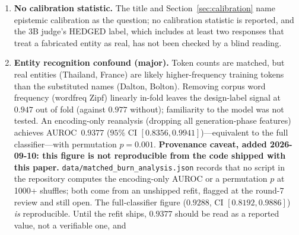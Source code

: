 \documentclass[11pt,a4paper]{article}
\begin{document}
\begin{enumerate}[nosep]
          $\kappa$ and the geometric detector's AUROC measure different
          things and are not compared here. The $\kappa$ is agreement
          between two judges labelling the model's generated responses for
          confabulation. The AUROC ($0.928$, $95\%$ CI $[0.813, 0.988]$)
          is how well a classifier on encoding- and generation-phase cache
          features plus generation-phase logit statistics separates prompts about the
          canonical entity from prompts about another real name in that slot, scored against the
          design label with no judge involved; its encoding-phase-only
          counterpart, which would make the call before generation, is the
          unverified $0.9377$ (next item). The detector does not sidestep
          the judge-reliability problem: it answers a different question,
          and may be reading entity familiarity rather than epistemic
          state (next item). Human validation remains the gold standard
          for the rate.
    \item \textbf{No calibration statistic.} The title and Section~\ref{sec:calibration} name epistemic calibration as the question; no calibration statistic is reported, and the 3B judge's HEDGED label, which includes at least two responses that treat a fabricated entity as real, has not been checked by a blind reading.
    \item \textbf{Entity recognition confound (major).} Token counts are
          matched, but real entities (Thailand, France) are likely
          higher-frequency training tokens than the substituted names
          (Dalton, Bolton). Removing corpus word frequency (wordfreq Zipf) linearly in-fold leaves the design-label signal at $0.947$ out of fold (against $0.977$ without); familiarity to the model was not tested. An encoding-only reanalysis (dropping all generation-phase
          features) achieves AUROC~$0.9377$ ($95\%$ CI $[0.8356, 0.9941]$)---equivalent to the full
          classifier---with permutation $p{=}0.001$. \textbf{Provenance caveat, added 2026-09-10:
          this figure is not reproducible from the code shipped with this paper.}
          \texttt{data/\allowbreak matched\_burn\_analysis.json} records that no script in the repository
          computes the encoding-only AUROC or a permutation $p$ at 1000+ shuffles; both come from
          an unshipped refit, flagged at the round-7 review and still open. The
          full-classifier figure ($0.9288$, CI $[0.8192, 0.9886]$) \emph{is} reproducible. Until
          the refit ships, $0.9377$ should be read as a reported value, not a verifiable one, and

\end{enumerate}
\end{document}
